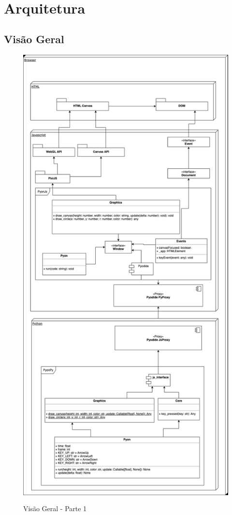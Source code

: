 \chapter*[Arquitetura]{Arquitetura}

\section{Visão Geral}

\begin{figure}[!h]
    \centering
    \caption{Visão Geral - Parte 1}
    \includegraphics[trim={0 23cm 0 0},clip,keepaspectratio=true,scale=0.8]{figuras/Arquitetura.eps}
    \label{fig:arquitetura}
\end{figure}

